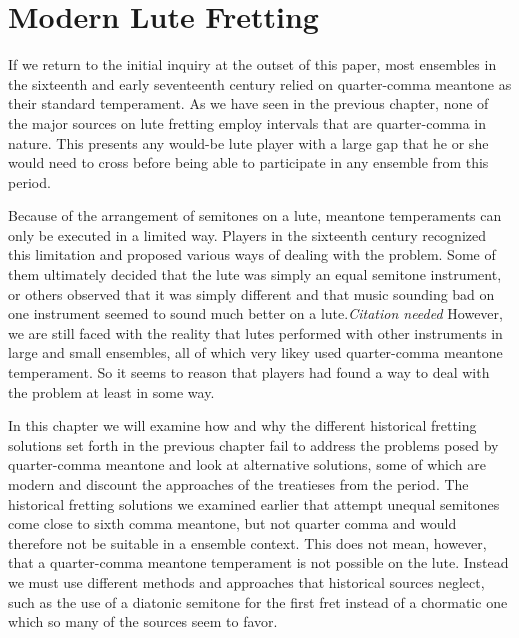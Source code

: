 %
%
%
%
%
%
%

\chapter{Modern Lute Fretting}

If we return to the initial inquiry at the outset of this paper, most ensembles in the
sixteenth and early seventeenth century relied on quarter-comma meantone as their standard
temperament. As we have seen in the previous chapter, none of the major sources on lute
fretting employ intervals that are quarter-comma in nature.  This presents any would-be
lute player with a large gap that he or she would need to cross before being able to
participate in any ensemble from this period.

Because of the arrangement of semitones on a lute, meantone temperaments can only be
executed in a limited way.  Players in the sixteenth century recognized this limitation
and proposed various ways of dealing with the problem.  Some of them ultimately decided
that the lute was simply an equal semitone instrument, or others observed that it was
simply different and that music sounding bad on one instrument seemed to sound much better
on a lute.\textit{Citation needed} However, we are still faced with the reality that lutes
performed with other instruments in large and small ensembles, all of which very likey
used quarter-comma meantone temperament.  So it seems to reason that players had found a
way to deal with the problem at least in some way.

In this chapter we will examine how and why the different historical fretting solutions
set forth in the previous chapter fail to address the problems posed by quarter-comma
meantone and look at alternative solutions, some of which are modern and discount the
approaches of the treatieses from the period. The historical fretting solutions we
examined earlier that attempt unequal semitones come close to sixth comma meantone, but
not quarter comma and would therefore not be suitable in a ensemble context.  This does
not mean, however, that a quarter-comma meantone temperament is not possible on the lute.
Instead we must use different methods and approaches that historical sources neglect, such
as the use of a diatonic semitone for the first fret instead of a chormatic one which so
many of the sources seem to favor.

